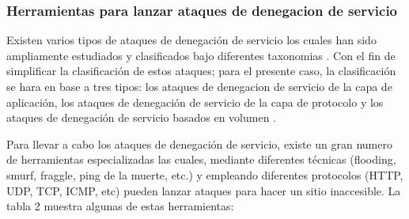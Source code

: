 \documentclass[12pt]{article}
\begin{document}


\subsubsection{Herramientas para lanzar ataques de denegacion de servicio} 

Existen varios tipos de ataques de denegación de servicio los cuales han sido ampliamente estudiados y clasificados bajo diferentes taxonomias \citep{dos_ataques_defensas_ea,taxonomy_DDoS}. Con el fin de simplificar la clasificación de estos ataques; para el presente caso, la clasificación se hara en base a tres tipos: los ataques de denegacion de servicio de la capa de aplicación, los ataques de denegación de servicio de la capa de protocolo y los ataques de denegación de servicio basados en volumen \citep{kali_goldeneye}.

Para llevar a cabo los ataques de denegación de servicio, existe un gran numero de herramientas especializadas \citep{dos_update_perspective,dos_tools} las cuales, mediante diferentes técnicas (flooding, smurf, fraggle, ping de la muerte, etc.) y empleando diferentes protocolos (HTTP, UDP, TCP, ICMP, etc) pueden lanzar ataques para hacer un sitio inaccesible. La tabla 2 muestra algunas de estas herramientas:  
\end{document}
